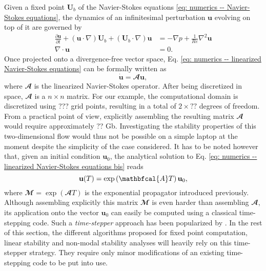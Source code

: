 Given a fixed point $\mathbf{U}_b$ of the Navier-Stokes equations \eqref{eq: numerics -- Navier-Stokes equations}, the dynamics of an infinitesimal perturbation $\mathbf{u}$ evolving on top of it are governed by
\begin{equation}
  \begin{aligned}
    \displaystyle \frac{\partial \mathbf{u}}{\partial t} + \left( \mathbf{u} \cdot \nabla \right) \mathbf{U}_b  + \left( \mathbf{U}_b \cdot \nabla \right) \mathbf{u} & = - \nabla p + \frac{1}{Re} \nabla^2 \mathbf{u} \\
    \nabla \cdot \mathbf{u} & = 0.
  \end{aligned}
  \label{eq: numerics -- linearized Navier-Stokes equations}
\end{equation}
Once projected onto a divergence-free vector space, Eq. \eqref{eq: numerics -- linearized Navier-Stokes equations} can be formally written as
\begin{equation}
  \dot{\mathbf{u}} = \mathbfcal{A}\mathbf{u},
  \label{eq: numerics -- linearized Navier-Stokes equations bis}
\end{equation}
where $\mathbfcal{A}$ is the linearized Navier-Stokes operator. After being discretized in space, $\mathbfcal{A}$ is a $n \times n$ matrix. For our example, the computational domain is discretized using ??? grid points, resulting in a total of $2 \times ??$ degrees of freedom. From a practical point of view, explicitly assembling the resulting matrix $\mathbfcal{A}$ would require approximately ?? Gb. Investigating the stability properties of this two-dimensional flow would thus not be possible on a simple laptop at the moment despite the simplicity of the case considered. It has to be noted however that, given an initial condition $\mathbf{u}_0$, the analytical solution to Eq. \eqref{eq: numerics -- linearized Navier-Stokes equations bis} reads
\begin{equation}
  \mathbf{u}(T) = \exp \left( \mathbfcal{A}T \right) \mathbf{u}_0,
  \notag
\end{equation}
where $\mathbfcal{M} = \exp \left( \mathbfcal{A}T \right)$ is the exponential propagator introduced previously. Although assembling explicitly this matrix $\mathbfcal{M}$ is even harder than assembling $\mathbfcal{A}$, its application onto the vector $\mathbf{u}_0$ can easily be computed using a classical time-stepping code. Such a \emph{time-stepper} approach has been popularized by \cite{??}. In the rest of this section, the different algorithms proposed for fixed point computation, linear stability and non-modal stability analyses will heavily rely on this time-stepper strategy. They require only minor modifications of an existing time-stepping code to be put into use.

